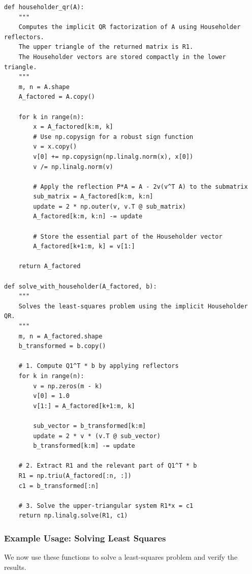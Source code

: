 \begin{verbatim}
def householder_qr(A):
    """
    Computes the implicit QR factorization of A using Householder reflectors.
    The upper triangle of the returned matrix is R1.
    The Householder vectors are stored compactly in the lower triangle.
    """
    m, n = A.shape
    A_factored = A.copy()
    
    for k in range(n):
        x = A_factored[k:m, k]
        # Use np.copysign for a robust sign function
        v = x.copy()
        v[0] += np.copysign(np.linalg.norm(x), x[0])
        v /= np.linalg.norm(v)
        
        # Apply the reflection P*A = A - 2v(v^T A) to the submatrix
        sub_matrix = A_factored[k:m, k:n]
        update = 2 * np.outer(v, v.T @ sub_matrix)
        A_factored[k:m, k:n] -= update
        
        # Store the essential part of the Householder vector
        A_factored[k+1:m, k] = v[1:]
        
    return A_factored

def solve_with_householder(A_factored, b):
    """
    Solves the least-squares problem using the implicit Householder QR.
    """
    m, n = A_factored.shape
    b_transformed = b.copy()
    
    # 1. Compute Q1^T * b by applying reflectors
    for k in range(n):
        v = np.zeros(m - k)
        v[0] = 1.0
        v[1:] = A_factored[k+1:m, k]
        
        sub_vector = b_transformed[k:m]
        update = 2 * v * (v.T @ sub_vector)
        b_transformed[k:m] -= update
        
    # 2. Extract R1 and the relevant part of Q1^T * b
    R1 = np.triu(A_factored[:n, :])
    c1 = b_transformed[:n]
    
    # 3. Solve the upper-triangular system R1*x = c1
    return np.linalg.solve(R1, c1)
\end{verbatim}

\subsubsection*{Example Usage: Solving Least Squares}
We now use these functions to solve a least-squares problem and verify the results.

